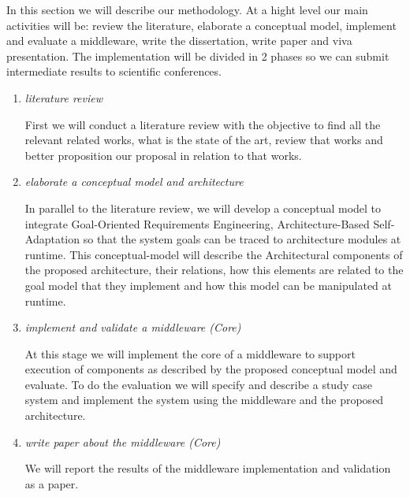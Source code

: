 In this section we will describe our methodology. At a hight level our main activities will be: review the literature, elaborate a conceptual model, implement and evaluate a middleware, write the dissertation, write paper and viva presentation.
The implementation will be divided in 2 phases so we can submit intermediate results to scientific conferences.

\begin{enumerate}

\item \emph{literature review}

First we will conduct a literature review with the objective to find all the relevant related works, what is the state of the art, review that works and better proposition our proposal in relation to that works.

\item \emph{elaborate a conceptual model and architecture}

In parallel to the literature review, we will develop a conceptual model to integrate Goal-Oriented Requirements Engineering, Architecture-Based Self-Adaptation so that the system goals can be traced to architecture modules at runtime. This conceptual-model will describe the Architectural components of the proposed architecture, their relations, how this elements are related to the goal model that they implement and how this model can be manipulated at runtime.


\item \emph{implement and validate a middleware (Core)}

At this stage we will implement the core of a middleware to support execution of components as described by the proposed conceptual model and evaluate. To do the evaluation we will specify and describe a study case system and implement the system using the middleware and the proposed architecture.

\item \emph{write paper about the middleware (Core)}

We will report the results of the middleware implementation and validation as a paper.





\end{enumerate}
